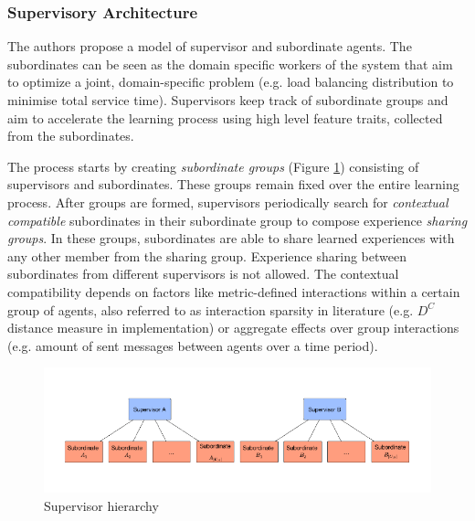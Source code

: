 \documentclass[letterpaper]{article}
\begin{document}
\subsubsection{Supervisory Architecture}
The authors propose a model of supervisor and subordinate agents. The subordinates can be seen as the domain specific workers of the system that aim to optimize a joint, domain-specific problem (e.g. load balancing distribution to minimise total service time). Supervisors keep track of subordinate groups and aim to accelerate the learning process using high level feature traits, collected from the subordinates.

The process starts by creating \textit{subordinate groups} (Figure \ref{fig:subordinate}) consisting of supervisors and subordinates. These groups remain fixed over the entire learning process. After groups are formed, supervisors periodically search for \textit{contextual compatible} subordinates in their subordinate group to compose experience \textit{sharing groups}. In these groups, subordinates are able to share learned experiences with any other member from the sharing group. Experience sharing between subordinates from different supervisors is not allowed. The contextual compatibility depends on factors like metric-defined interactions within a certain group of agents, also referred to as interaction sparsity in literature (e.g. $D^C$ distance measure in implementation) or aggregate effects over group interactions (e.g. amount of sent messages between agents over a time period).
\begin{figure}[H]
 \begin{center}
  \includegraphics[width=\linewidth]{figures/subordinates}
  \caption{Supervisor hierarchy \citep{garant2015accelerating}}
  \label{fig:subordinate}
 \end{center}
\end{figure}
\end{document}
